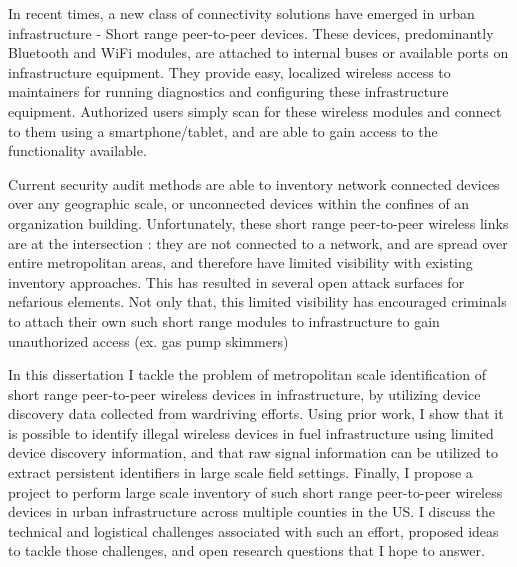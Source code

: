 \begin{dissertationintroduction}
    In recent times, a new class of connectivity solutions have emerged in urban infrastructure - Short range peer-to-peer devices. These devices, predominantly Bluetooth and WiFi modules, are attached to internal buses or available ports on infrastructure equipment. They provide easy, localized wireless access to maintainers for running diagnostics and configuring these infrastructure equipment. Authorized users simply scan for these wireless modules and connect to them using a smartphone/tablet, and are able to gain access to the functionality available.
    
    Current security audit methods are able to inventory network connected devices over any geographic scale, or unconnected devices within the confines of an organization building. Unfortunately, these short range peer-to-peer wireless links are at the intersection : they are not connected to a network, and are spread over entire metropolitan areas, and therefore have limited visibility with existing inventory approaches. This has resulted in several open attack surfaces for nefarious elements. Not only that, this limited visibility has encouraged criminals to attach their own such short range modules to infrastructure to gain unauthorized access (ex. gas pump skimmers)
    
    In this dissertation I tackle the problem of metropolitan scale identification of short range peer-to-peer wireless devices in infrastructure, by utilizing device discovery data collected from wardriving efforts. Using prior work, I show that it is possible to identify illegal wireless devices in fuel infrastructure using limited device discovery information, and that raw signal information can be utilized to extract persistent identifiers in large scale field settings. Finally, I propose a project to perform large scale inventory of such short range peer-to-peer wireless devices in urban infrastructure across multiple counties in the US. I discuss the technical and logistical challenges associated with such an effort, proposed ideas to tackle those challenges, and open research questions that I hope to answer.
    
\end{dissertationintroduction}